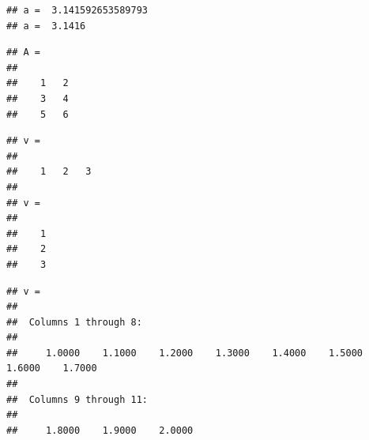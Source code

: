 \documentclass[
]{book}
\newenvironment{Shaded}{\begin{snugshade}}{\end{snugshade}}
\newcommand{\CommentTok}[1]{\textcolor[rgb]{0.56,0.35,0.01}{\textit{#1}}}
\newcommand{\FloatTok}[1]{\textcolor[rgb]{0.00,0.00,0.81}{#1}}
\newcommand{\NormalTok}[1]{#1}
\newcommand{\OperatorTok}[1]{\textcolor[rgb]{0.81,0.36,0.00}{\textbf{#1}}}
\begin{document}
\begin{verbatim}
## a =  3.141592653589793
## a =  3.1416
\end{verbatim}

\begin{Shaded}
\end{Shaded}

\begin{verbatim}
## A =
## 
##    1   2
##    3   4
##    5   6
\end{verbatim}

\begin{Shaded}
\end{Shaded}

\begin{verbatim}
## v =
## 
##    1   2   3
## 
## v =
## 
##    1
##    2
##    3
\end{verbatim}

\begin{Shaded}
\end{Shaded}

\begin{verbatim}
## v =
## 
##  Columns 1 through 8:
## 
##     1.0000    1.1000    1.2000    1.3000    1.4000    1.5000    1.6000    1.7000
## 
##  Columns 9 through 11:
## 
##     1.8000    1.9000    2.0000
\end{verbatim}
\end{document}
